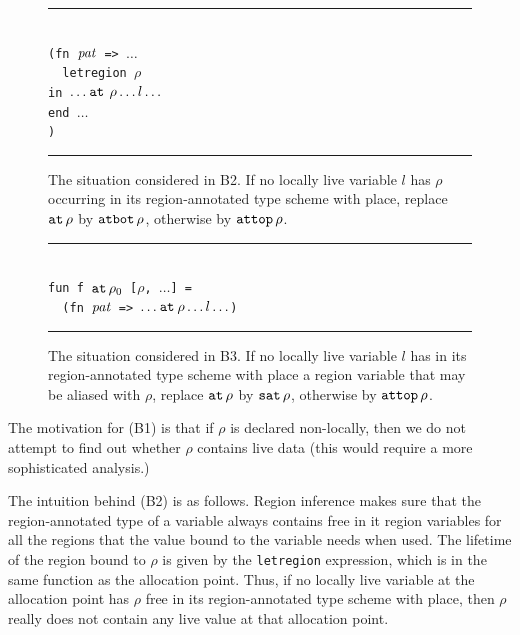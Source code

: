 \documentclass[12pt]{book}
\begin{document}
\begin{figure}
\hrule
\begin{center}
\begin{tabbing}
\\
\hskip3cm\=\tt (fn ${\it pat}$ => $\ldots$\\
       \>\ \ \=\tt letregion $\rho$ \\
       \>    \>\tt in  $\ldots\mathbin{\hbox{\tt at}}\,\rho\ldots l \ldots$\\
       \>    \>\tt end $\ldots$\\
       \>\tt )
\end{tabbing}
\end{center}
\caption{The situation considered in B2. If no locally live variable
  $l$ has $\rho$ occurring in its region-annotated type scheme with
  place, replace $\mathbin{\hbox{\tt at}}\,\rho$ by $\hbox{\tt atbot}\,\rho$, otherwise by
  $\hbox{\tt attop}\,\rho$.}  \medskip \hrule
\label{b2.fig}
\end{figure}

\begin{figure}
\hrule
\begin{center}
\begin{tabbing}
\\
\hskip3cm\=\tt fun f $\mathbin{\hbox{\tt at}}\,\rho_0$ [$\rho$, $\ldots$] = \\
         \>\tt \ \ \=\tt (fn ${\it pat}$ => $\ldots\mathbin{\hbox{\tt at}}\rho\ldots l\ldots$)
\end{tabbing}
\end{center}
\caption{The situation considered in B3. If no locally live variable
  $l$ has in its region-annotated type scheme with place a region
  variable that may be aliased with $\rho$, replace $\mathbin{\hbox{\tt at}}\,\rho$ by
  $\hbox{\tt sat}\,\rho$, otherwise by $\hbox{\tt attop}\,\rho$.}  \medskip \hrule
\label{b3.fig}
\end{figure}
The motivation for (B1) is that if $\rho$ is declared non-locally,
then we do not attempt to find out whether $\rho$ contains live data
(this would require a more sophisticated analysis.)  

The intuition behind (B2) is as follows. Region inference makes sure
that the region-annotated type of a variable always contains free in
it region variables for all the regions that the value bound to the
variable needs when used. The lifetime of the region bound to $\rho$
is given by the {\tt letregion} expression, which is in the same
function as the allocation point. Thus, if no locally live variable at
the allocation point has $\rho$ free in its region-annotated type
scheme with place, then $\rho$ really does not contain any live value
at that allocation point.
\end{document}

